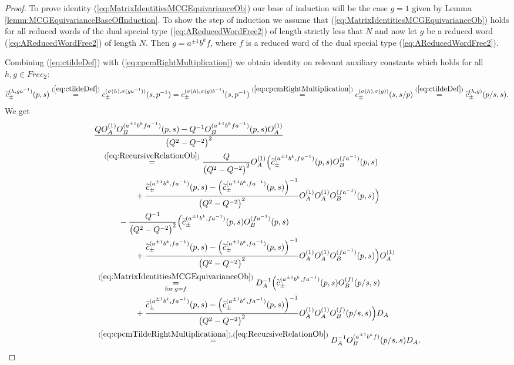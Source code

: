 \documentclass{amsart}
\begin{document}
\begin{proof}
To prove identity (\ref{eq:MatrixIdentitiesMCGEquivarianceOb}) our base of induction will be the case $g=1$ given by Lemma \ref{lemm:MCGEquivarianceBaseOfInduction}. To show the step of induction we assume that (\ref{eq:MatrixIdentitiesMCGEquivarianceOb}) holds for all reduced words of the dual special type (\ref{eq:AReducedWordFree2}) of length strictly less that $N$ and now let $g$ be a reduced word (\ref{eq:AReducedWordFree2}) of length $N$. Then $g=a^{\pm1}b^kf$, where $f$ is a reduced word of the dual special type (\ref{eq:AReducedWordFree2}).

Combining (\ref{eq:ctildeDef}) with (\ref{eq:cpcmRightMultiplication}) we obtain identity on relevant auxiliary constants which holds for all $h,g\in Free_2$:
\begin{equation}
\widetilde c_{\pm}^{(h,ga^{-1})}(p,s)\overset{(\ref{eq:ctildeDef})}{=}c_{\pm}^{(\sigma(h),\sigma(ga^{-1}))}(s,p^{-1})=c_{\pm}^{(\sigma(h),\sigma(g)b^{-1})}(s,p^{-1})\overset{(\ref{eq:cpcmRightMultiplication})}{=}c_{\pm}^{(\sigma(h),\sigma(g))}(s,s/p)\overset{(\ref{eq:ctildeDef})}{=}\widetilde c_{\pm}^{(h,g)}(p/s,s).
\label{eq:cpcmTildeRightMultiplicationa}
\end{equation}
We get
\begin{align*}
&\frac{QO_A^{(1)}O_B^{(a^{\pm1}b^kfa^{-1})}(p,s)-Q^{-1}O_B^{(a^{\pm1}b^kfa^{-1})}(p,s)O_A^{(1)}}{\big(Q^2-Q^{-2}\big)^2}\\
&\quad\overset{(\ref{eq:RecursiveRelationOb})}{=}\frac{Q}{\big(Q^2-Q^{-2}\big)^2}O_A^{(1)}\Big(\widetilde c_{\pm}^{(a^{\pm1}b^k,fa^{-1})}(p,s) O_B^{(fa^{-1})}(p,s)\\
&\qquad\qquad\quad+\frac{\widetilde c_{\pm}^{(a^{\pm1}b^k,fa^{-1})}(p,s)-\left(\widetilde c_{\pm}^{(a^{\pm1}b^k,fa^{-1})}(p,s)\right)^{-1}}{\big(Q^2-Q^{-2}\big)^2}O_A^{(1)}O_A^{(1)}O_B^{(fa^{-1})}(p,s)\Big)\\
&\qquad\quad-\frac{Q^{-1}}{\big(Q^2-Q^{-2}\big)^2}\Big(\widetilde c_{\pm}^{(a^{\pm1}b^k,fa^{-1})}(p,s) O_B^{(fa^{-1})}(p,s)\\
&\qquad\qquad\quad+\frac{\widetilde c_{\pm}^{(a^{\pm1}b^k,fa^{-1})}(p,s)-\left(\widetilde c_{\pm}^{(a^{\pm1}b^k,fa^{-1})}(p,s)\right)^{-1}}{\big(Q^2-Q^{-2}\big)^2}O_A^{(1)}O_A^{(1)}O_B^{(fa^{-1})}(p,s)\Big)O_A^{(1)}\\
&\;\overset{(\ref{eq:MatrixIdentitiesMCGEquivarianceOb})}{\underset{\textrm{for}\;g=f}{=}}D_A^{-1}\Big(\widetilde c_{\pm}^{(a^{\pm1}b^k,fa^{-1})}(p,s) O_B^{(f)}(p/s,s)\\
&\qquad\qquad\quad+\frac{\widetilde c_{\pm}^{(a^{\pm1}b^k,fa^{-1})}(p,s)-\left(\widetilde c_{\pm}^{(a^{\pm1}b^k,fa^{-1})}(p,s)\right)^{-1}}{\big(Q^2-Q^{-2}\big)^2}O_A^{(1)}O_A^{(1)}O_B^{(f)}(p/s,s)\Big)D_A\\
&\;\overset{(\ref{eq:cpcmTildeRightMultiplicationa}),(\ref{eq:RecursiveRelationOb})}{=}D_A^{-1}O_B^{(a^{\pm1}b^kf)}(p/s,s)D_A.
\end{align*}
\end{proof}
\end{document}
